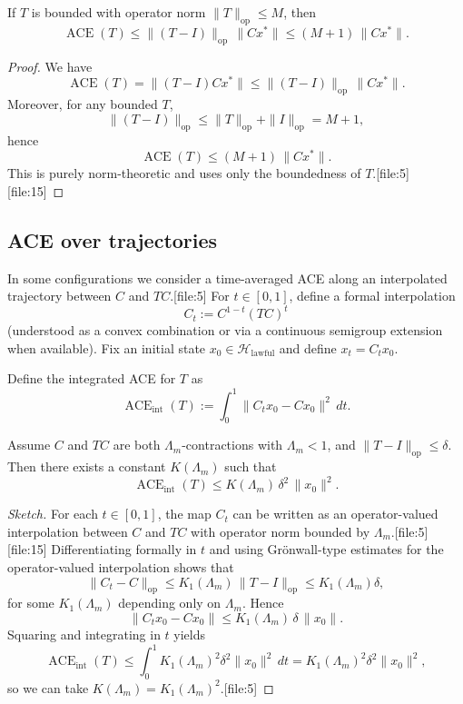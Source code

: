 \documentclass[11pt]{article}
\begin{document}
\begin{lemma}
If \(T\) is bounded with operator norm \(\|T\|_{\mathrm{op}} \le M\), then
\[
\operatorname{ACE}(T) \le \|(T-I)\|_{\mathrm{op}} \,\|Cx^\ast\| \le (M+1)\,\|Cx^\ast\|.
\]
\end{lemma}

\begin{proof}
We have
\[
\operatorname{ACE}(T) = \|(T-I)Cx^\ast\| \le \|(T-I)\|_{\mathrm{op}} \,\|Cx^\ast\|.
\]
Moreover, for any bounded \(T\),
\[
\|(T-I)\|_{\mathrm{op}} \le \|T\|_{\mathrm{op}} + \|I\|_{\mathrm{op}} = M + 1,
\]
hence
\[
\operatorname{ACE}(T) \le (M+1)\,\|Cx^\ast\|.
\]
This is purely norm-theoretic and uses only the boundedness of \(T\).[file:5][file:15]
\end{proof}

\subsection{ACE over trajectories}

In some configurations we consider a time-averaged ACE along an interpolated trajectory between \(C\) and \(TC\).[file:5]  
For \(t\in[0,1]\), define a formal interpolation
\[
C_t := C^{1-t}(TC)^t
\]
(understood as a convex combination or via a continuous semigroup extension when available).  
Fix an initial state \(x_0\in\mathcal{H}_{\mathrm{lawful}}\) and define \(x_t = C_t x_0\).

\begin{definition}
Define the integrated ACE for \(T\) as
\[
\operatorname{ACE}_{\mathrm{int}}(T) := \int_0^1 \| C_t x_0 - Cx_0 \|^2\,dt.
\]
\end{definition}

\begin{lemma}
Assume \(C\) and \(TC\) are both \(\Lambda_m\)-contractions with \(\Lambda_m<1\), and \(\|T-I\|_{\mathrm{op}} \le \delta\).  
Then there exists a constant \(K(\Lambda_m)\) such that
\[
\operatorname{ACE}_{\mathrm{int}}(T) \le K(\Lambda_m)\, \delta^2 \,\|x_0\|^2.
\]
\end{lemma}

\begin{proof}[Sketch]
For each \(t\in[0,1]\), the map \(C_t\) can be written as an operator-valued interpolation between \(C\) and \(TC\) with operator norm bounded by \(\Lambda_m\).[file:5][file:15]  
Differentiating formally in \(t\) and using Grönwall-type estimates for the operator-valued interpolation shows that
\[
\|C_t - C\|_{\mathrm{op}} \le K_1(\Lambda_m)\,\|T-I\|_{\mathrm{op}} \le K_1(\Lambda_m) \delta,
\]
for some \(K_1(\Lambda_m)\) depending only on \(\Lambda_m\).  
Hence
\[
\|C_t x_0 - Cx_0\| \le K_1(\Lambda_m)\,\delta\,\|x_0\|.
\]
Squaring and integrating in \(t\) yields
\[
\operatorname{ACE}_{\mathrm{int}}(T) \le \int_0^1 K_1(\Lambda_m)^2 \delta^2 \|x_0\|^2\, dt
= K_1(\Lambda_m)^2 \delta^2 \|x_0\|^2,
\]
so we can take \(K(\Lambda_m) = K_1(\Lambda_m)^2\).[file:5]
\end{proof}
\end{document}
